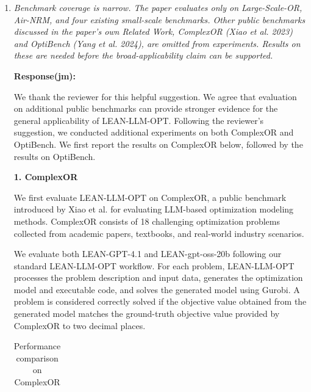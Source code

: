 \documentclass[11pt]{article}
\newcommand{\edit}[1]{{\color{hopkins-blue}\itshape #1}}
\newcommand{\planned}{\noindent\underline{\textbf{Planned response}}:\ }
\newcommand{\expected}{\noindent\textbf{Expected outputs.} }
\begin{document}
\begin{enumerate}[label=(R2.Major.\arabic*),leftmargin=*]

\item \edit{Benchmark coverage is narrow. The paper evaluates only on Large-Scale-OR, Air-NRM, and four existing small-scale benchmarks. Other public benchmarks discussed in the paper's own Related Work, ComplexOR (Xiao et al. 2023) and OptiBench (Yang et al. 2024), are omitted from experiments. Results on these are needed before the broad-applicability claim can be supported.}\label{R2-major-1}



\textbf{Response(jm):}

We thank the reviewer for this helpful suggestion. We agree that evaluation on additional public benchmarks can provide stronger evidence for the general applicability of LEAN-LLM-OPT. Following the reviewer's suggestion, we conducted additional experiments on both ComplexOR and OptiBench. We first report the results on ComplexOR below, followed by the results on OptiBench.

\medskip
\noindent
\textbf{1. ComplexOR}

We first evaluate LEAN-LLM-OPT on ComplexOR, a public benchmark introduced by Xiao et al. \citep{xiao2024chain} for evaluating LLM-based optimization modeling methods. ComplexOR consists of 18 challenging optimization problems collected from academic papers, textbooks, and real-world industry scenarios.

We evaluate both LEAN-GPT-4.1 and LEAN-gpt-oss-20b following our standard LEAN-LLM-OPT workflow. For each problem, LEAN-LLM-OPT processes the problem description and input data, generates the optimization model and executable code, and solves the generated model using Gurobi. A problem is considered correctly solved if the objective value obtained from the generated model matches the ground-truth objective value provided by ComplexOR to two decimal places.

\begin{longtable}{lc}
\caption{Performance comparison on ComplexOR}
\label{tab:complexor_results} \\


\end{longtable}
\end{enumerate}
\end{document}
